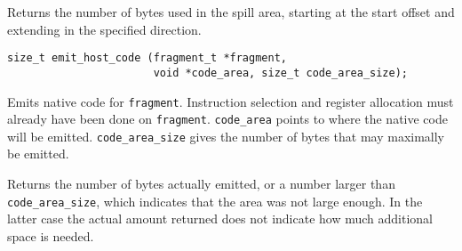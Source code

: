 \documentclass{article}
\newcommand{\cc}[1]{\texttt{#1}} %
\begin{document}
Returns the number of bytes used in the spill area, starting at the
start offset and extending in the specified direction.

\begin{verbatim}
size_t emit_host_code (fragment_t *fragment,
                       void *code_area, size_t code_area_size);
\end{verbatim}

Emits native code for \cc{fragment}.  Instruction selection and
register allocation must already have been done on \cc{fragment}.
\cc{code\_area} points to where the native code will be emitted.
\cc{code\_area\_size} gives the number of bytes that may maximally
be emitted.

Returns the number of bytes actually emitted, or a number larger than
\cc{code\_area\_size}, which indicates that the area was not large
enough.  In the latter case the actual amount returned does not
indicate how much additional space is needed.

\begingroup
\setlength{\parindent}{0pt}\setlength{\parskip}{2ex}
\renewcommand{\enotesize}{\normalsize}
\theendnotes\endgroup
\end{document}
